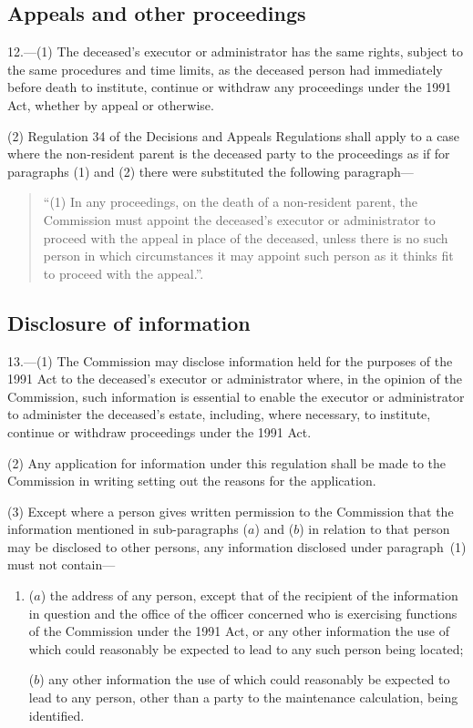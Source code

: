 \documentclass[12pt,a4paper]{article}
\begin{document}
\subsection[12. Appeals and other proceedings]{Appeals and other proceedings}

12.---(1)  The deceased’s executor or administrator has the same rights, subject to the same procedures and time limits, as the deceased person had immediately before death to institute, continue or withdraw any proceedings under the 1991 Act, whether by appeal or otherwise.

(2) Regulation 34 of the Decisions and Appeals Regulations shall apply to a case where the non-resident parent is the deceased party to the proceedings as if for paragraphs (1) and (2) there were substituted the following paragraph—
\begin{quotation}
“(1) In any proceedings, on the death of a non-resident parent, the Commission must appoint the deceased’s executor or administrator to proceed with the appeal in place of the deceased, unless there is no such person in which circumstances it may appoint such person as it thinks fit to proceed with the appeal.”.
\end{quotation}

\subsection[13. Disclosure of information]{Disclosure of information}

13.---(1)  The Commission may disclose information held for the purposes of the 1991 Act to the deceased’s executor or administrator where, in the opinion of the Commission, such information is essential to enable the executor or administrator to administer the deceased’s estate, including, where necessary, to institute, continue or withdraw proceedings under the 1991 Act.

(2) Any application for information under this regulation shall be made to the Commission in writing setting out the reasons for the application.

(3) Except where a person gives written permission to the Commission that the information mentioned in sub-paragraphs ($a$)  and ($b$)  in relation to that person may be disclosed to other persons, any information disclosed under paragraph~(1) must not contain—
\begin{enumerate}\item[]
($a$) the address of any person, except that of the recipient of the information in question and the office of the officer concerned who is exercising functions of the Commission under the 1991 Act, or any other information the use of which could reasonably be expected to lead to any such person being located;

($b$) any other information the use of which could reasonably be expected to lead to any person, other than a party to the maintenance calculation, being identified.
\end{enumerate}
\end{document}
